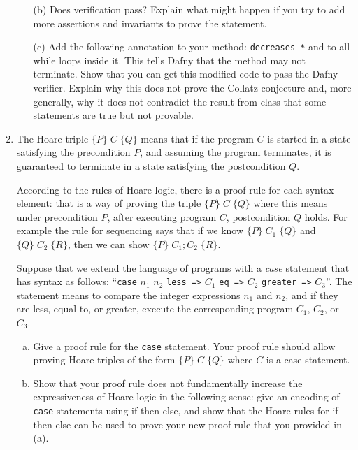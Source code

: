 \documentclass{article}
\newcommand{\hoare}[3]{\{#1\} \; #2 \; \{#3\}}
\begin{document}
\begin{enumerate}
\begin{enumerate}
\item[(b)]
Does verification pass?
Explain what might happen if you try to add more assertions and invariants to prove the statement.

\item[(c)]
Add the following annotation to your method:
\texttt{decreases *} and to all while loops inside it.
This tells Dafny that the method may not terminate.
Show that you can get this modified code to pass the Dafny verifier.
Explain why this does not prove the Collatz conjecture and, more generally,
why it does not contradict the result from class that some statements are true but not provable.

\end{enumerate}

\item
The Hoare triple $\hoare{P}{C}{Q}$ means that if the program $C$ is started in a state
satisfying the precondition $P$, and assuming the program terminates,
it is guaranteed to terminate in a state satisfying the postcondition $Q$.

According to the rules of Hoare logic,
there is a proof rule for each syntax element: that is a way of proving
the triple $\hoare{P}{C}{Q}$ where this means under precondition $P$, after executing program $C$, postcondition $Q$ holds.
For example the rule for sequencing says that if we know $\hoare{P}{C_1}{Q}$ and $\hoare{Q}{C_2}{R}$,
then we can show $\hoare{P}{C_1; C_2}{R}$.

Suppose that we extend the language of programs with a \emph{case} statement that has syntax as follows:
``\texttt{case} $n_1$ $n_2$ \texttt{less =>} $C_1$ \texttt{eq =>} $C_2$ \texttt{greater =>} $C_3$''.
The statement means to compare the integer expressions $n_1$ and $n_2$, and if they are less, equal to, or greater, execute the corresponding program $C_1$, $C_2$, or $C_3$.

\begin{enumerate}[(a)]
\item Give a proof rule for the \texttt{case} statement. Your proof rule should allow proving
Hoare triples of the form $\hoare{P}{C}{Q}$ where $C$ is a case statement.
\item Show that your proof rule does not fundamentally increase the expressiveness of Hoare logic in the following sense: give an encoding of \texttt{case} statements using if-then-else,
and show that the Hoare rules for if-then-else can be used to prove your new proof rule that you provided in (a).
\end{enumerate}


\end{enumerate}
\end{document}
